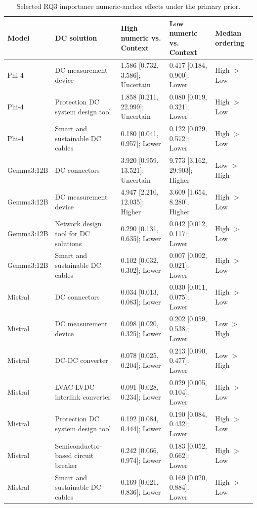 \begin{table}[tbp]
\caption{Selected RQ3 importance numeric-anchor effects under the primary prior.}
\label{tab:rq3-importance-selected-numeric}
\begin{tabular}{p{1.8cm}p{4.0cm}p{3.7cm}p{3.7cm}p{1.8cm}}
\toprule
Model & DC solution & High numeric vs. Context & Low numeric vs. Context & Median ordering \\
\midrule
Phi-4 & DC measurement device & 1.586 [0.732, 3.586]; Uncertain & 0.417 [0.184, 0.900]; Lower & High $>$ Low \\
Phi-4 & Protection DC system design tool & 1.858 [0.211, 22.999]; Uncertain & 0.080 [0.019, 0.321]; Lower & High $>$ Low \\
Phi-4 & Smart and sustainable DC cables & 0.180 [0.041, 0.957]; Lower & 0.122 [0.029, 0.572]; Lower & High $>$ Low \\
Gemma3:12B & DC connectors & 3.920 [0.959, 13.521]; Uncertain & 9.773 [3.162, 29.903]; Higher & Low $>$ High \\
Gemma3:12B & DC measurement device & 4.947 [2.210, 12.035]; Higher & 3.609 [1.654, 8.280]; Higher & High $>$ Low \\
Gemma3:12B & Network design tool for DC solutions & 0.290 [0.131, 0.635]; Lower & 0.042 [0.012, 0.117]; Lower & High $>$ Low \\
Gemma3:12B & Smart and sustainable DC cables & 0.102 [0.032, 0.302]; Lower & 0.007 [0.002, 0.021]; Lower & High $>$ Low \\
Mistral & DC connectors & 0.034 [0.013, 0.083]; Lower & 0.030 [0.011, 0.075]; Lower & High $>$ Low \\
Mistral & DC measurement device & 0.098 [0.020, 0.325]; Lower & 0.202 [0.059, 0.538]; Lower & Low $>$ High \\
Mistral & DC-DC converter & 0.078 [0.025, 0.204]; Lower & 0.213 [0.090, 0.477]; Lower & Low $>$ High \\
Mistral & LVAC-LVDC interlink converter & 0.091 [0.028, 0.234]; Lower & 0.029 [0.005, 0.104]; Lower & High $>$ Low \\
Mistral & Protection DC system design tool & 0.192 [0.084, 0.444]; Lower & 0.190 [0.084, 0.432]; Lower & High $>$ Low \\
Mistral & Semiconductor-based circuit breaker & 0.242 [0.066, 0.974]; Lower & 0.183 [0.052, 0.662]; Lower & High $>$ Low \\
Mistral & Smart and sustainable DC cables & 0.169 [0.021, 0.836]; Lower & 0.169 [0.020, 0.884]; Lower & High $>$ Low \\

\end{tabular}
\end{table}
